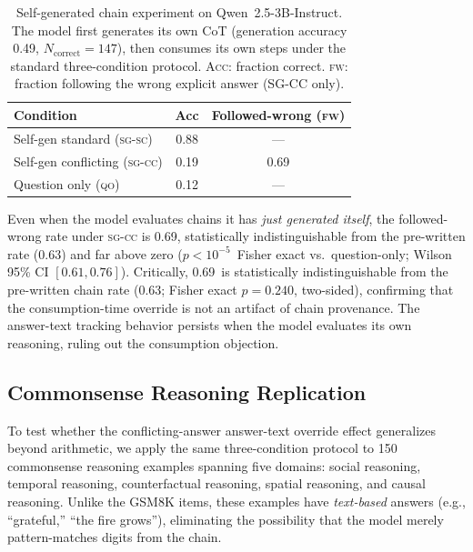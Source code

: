 \documentclass{article}
\theoremstyle{definition}
\theoremstyle{definition}
\newcommand{\CCFW}{0.63}
\newcommand{\GENNCORRECT}{147}
\newcommand{\GENNACC}{0.49}
\newcommand{\SGSCACC}{0.88}
\newcommand{\SGCCACC}{0.19}
\newcommand{\SGCCFW}{0.69}
\newcommand{\SGQOACC}{0.12}
\newcommand{\SGCCFWCILOW}{0.61}
\newcommand{\SGCCFWCIHIGH}{0.76}
\newcommand{\SGCCPVAL}{$p < 10^{-5}$}
\newcommand{\SGVSPREWRITTENPVAL}{0.240}
\begin{document}
\begin{table}[h]
\centering
\caption{Self-generated chain experiment on Qwen~2.5-3B-Instruct.
  The model first generates its own CoT (generation accuracy \GENNACC,
  $N_{\text{correct}}{=}\GENNCORRECT$), then consumes its own steps under
  the standard three-condition protocol. \textsc{Acc}: fraction correct.
  \textsc{fw}: fraction following the wrong explicit answer (SG-CC only).}
\label{tab:generation}
\begin{tabular}{lcc}
\toprule
Condition & Acc & Followed-wrong (\textsc{fw}) \\
\midrule
Self-gen standard (\textsc{sg-sc})      & \SGSCACC  & --- \\
Self-gen conflicting (\textsc{sg-cc})   & \SGCCACC  & \SGCCFW \\
Question only (\textsc{qo})             & \SGQOACC  & --- \\
\bottomrule
\end{tabular}
\end{table}

Even when the model evaluates chains it has
\emph{just generated itself}, the followed-wrong rate under \textsc{sg-cc}
is \SGCCFW, statistically indistinguishable from the pre-written rate (\CCFW)
and far above zero (\SGCCPVAL\ Fisher exact vs.\ question-only;
Wilson 95\% CI $[\SGCCFWCILOW, \SGCCFWCIHIGH]$).
Critically, \SGCCFW\ is statistically indistinguishable from the pre-written chain
rate (\CCFW; Fisher exact $p{=}\SGVSPREWRITTENPVAL$, two-sided), confirming that
the consumption-time override is not an artifact of chain provenance.
The answer-text tracking behavior persists
when the model evaluates its own reasoning, ruling out the consumption objection.

\subsection{Commonsense Reasoning Replication}
\label{sec:commonsense}

To test whether the conflicting-answer answer-text override effect generalizes
beyond arithmetic, we apply the same three-condition protocol to 150
commonsense reasoning examples spanning five domains: social reasoning,
temporal reasoning, counterfactual reasoning, spatial reasoning, and causal
reasoning. Unlike the GSM8K items, these examples have \emph{text-based}
answers (e.g., ``grateful,'' ``the fire grows''), eliminating the possibility
that the model merely pattern-matches digits from the chain.
\end{document}

